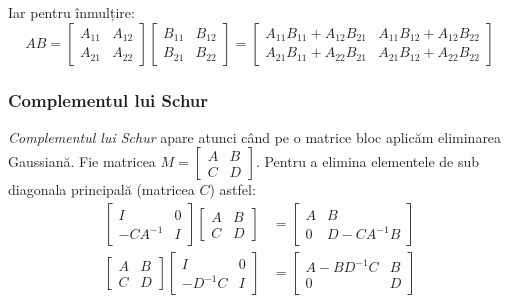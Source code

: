 \documentclass{exam}
\begin{document}
Iar pentru înmulțire:
\begin{equation*}
	A B = \begin{bmatrix} A_{11} & A_{12} \\ A_{21} & A_{22} \end{bmatrix} \begin{bmatrix} B_{11} & B_{12} \\ B_{21} & B_{22} \end{bmatrix} = \begin{bmatrix} A_{11} B_{11} + A_{12} B_{21} & A_{11} B_{12} + A_{12} B_{22} \\ A_{21} B_{11} + A_{22} B_{21} & A_{21} B_{12} + A_{22} B_{22} \end{bmatrix}
\end{equation*}

\subsubsection{Complementul lui Schur}
\textit{Complementul lui Schur} \cite{Schur1917} apare atunci când pe o matrice bloc aplicăm
eliminarea Gaussiană. Fie matricea $M = \begin{bmatrix} A & B \\ C & D \end{bmatrix}$.
Pentru a elimina elementele de sub diagonala principală (matricea $C$) astfel:
\begin{align*}
	\begin{bmatrix}
		I         & 0 \\
		-C A^{-1} & I
	\end{bmatrix}
	\begin{bmatrix}
		A & B \\
		C & D
	\end{bmatrix}
	 & =
	\begin{bmatrix}
		A & B              \\
		0 & D - C A^{-1} B
	\end{bmatrix} \\
	\begin{bmatrix}
		A & B \\
		C & D
	\end{bmatrix}
	\begin{bmatrix}
		I         & 0 \\
		-D^{-1} C & I
	\end{bmatrix}
	 & =
	\begin{bmatrix}
		A - B D^{-1} C & B \\
		0              & D
	\end{bmatrix}
\end{align*}
\end{document}
